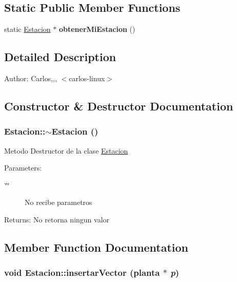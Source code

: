 \subsection*{Static Public Member Functions}
\begin{CompactItemize}
\item 
\hypertarget{classEstacion_f0728410da6356cae82e39b90d6eab76}{
static \hyperlink{classEstacion}{Estacion} $\ast$ \textbf{obtenerMiEstacion} ()}
\label{classEstacion_f0728410da6356cae82e39b90d6eab76}

\end{CompactItemize}


\subsection{Detailed Description}
\begin{Desc}
\item[Author:]Carlos,,, $<$carlos-linux$>$ \end{Desc}


\subsection{Constructor \& Destructor Documentation}
\hypertarget{classEstacion_c774576e546f622b60b08b0a952e6a55}{
\subsubsection[$\sim$Estacion]{\setlength{\rightskip}{0pt plus 5cm}Estacion::$\sim$Estacion ()}}
\label{classEstacion_c774576e546f622b60b08b0a952e6a55}


Metodo Destructor de la clase \hyperlink{classEstacion}{Estacion} \begin{Desc}
\item[Parameters:]
\begin{description}
\item[{\em \char`\"{}\char`\"{}}]No recibe parametros \end{description}
\end{Desc}
\begin{Desc}
\item[Returns:]No retorna ningun valor \end{Desc}


\subsection{Member Function Documentation}
\hypertarget{classEstacion_7ccecfbe6a3cea5fd897cfce7851a005}{
\subsubsection[insertarVector]{\setlength{\rightskip}{0pt plus 5cm}void Estacion::insertarVector ({\bf planta} $\ast$ {\em p})}}
\label{classEstacion_7ccecfbe6a3cea5fd897cfce7851a005}


